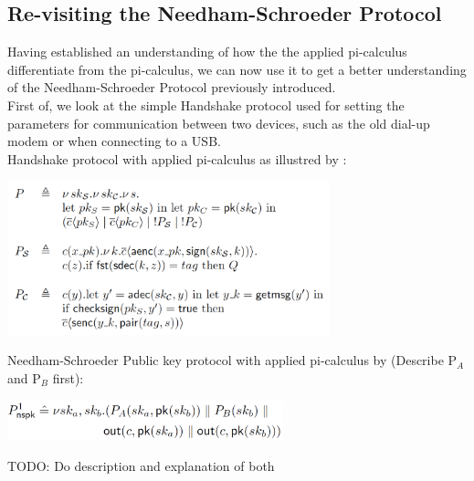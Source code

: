\subsection{Re-visiting the Needham-Schroeder Protocol}
Having established an understanding of how the the applied pi-calculus differentiate from the pi-calculus, we can now use it to get a better understanding of the Needham-Schroeder Protocol previously introduced.\\

First of, we look at the simple Handshake protocol used for setting the parameters for communication between two devices, such as the old dial-up modem or when connecting to a USB.  \\
Handshake protocol with applied pi-calculus as illustred by \citeauthor{AplliedPiCalsulus2010}:
\begin{center}
\includegraphics[width=0.7\textwidth, angle=0]{Graphics/Handshake.pdf}
\end{center}
Needham-Schroeder Public key protocol with applied pi-calculus by \citeauthor{DBLP:journals/ftpl/CortierK14} (Describe P$_{A}$ and P$_{B}$ first):
\begin{center}
\includegraphics[width=0.6\textwidth, angle=0]{Graphics/P1_nspk.pdf}
\end{center}
TODO: Do description and explanation of both 
